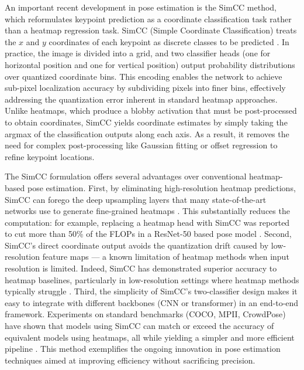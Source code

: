 An important recent development in pose estimation is the SimCC method, which reformulates keypoint prediction as a coordinate classification task rather than a heatmap regression task. SimCC (Simple Coordinate Classification) treats the $x$ and $y$ coordinates of each keypoint as discrete classes to be predicted \citep{Li2022SimCC}. In practice, the image is divided into a grid, and two classifier heads (one for horizontal position and one for vertical position) output probability distributions over quantized coordinate bins. This encoding enables the network to achieve sub-pixel localization accuracy by subdividing pixels into finer bins, effectively addressing the quantization error inherent in standard heatmap approaches. Unlike heatmaps, which produce a blobby activation that must be post-processed to obtain coordinates, SimCC yields coordinate estimates by simply taking the argmax of the classification outputs along each axis. As a result, it removes the need for complex post-processing like Gaussian fitting or offset regression to refine keypoint locations.

The SimCC formulation offers several advantages over conventional heatmap-based pose estimation. First, by eliminating high-resolution heatmap predictions, SimCC can forego the deep upsampling layers that many state-of-the-art networks use to generate fine-grained heatmaps \citep{Li2022SimCC}. This substantially reduces the computation: for example, replacing a heatmap head with SimCC was reported to cut more than 50\% of the FLOPs in a ResNet-50 based pose model \citep{Li2022SimCC}. Second, SimCC’s direct coordinate output avoids the quantization drift caused by low-resolution feature maps — a known limitation of heatmap methods when input resolution is limited. Indeed, SimCC has demonstrated superior accuracy to heatmap baselines, particularly in low-resolution settings where heatmap methods typically struggle \citep{Li2022SimCC}. Third, the simplicity of SimCC’s two-classifier design makes it easy to integrate with different backbones (CNN or transformer) in an end-to-end framework. Experiments on standard benchmarks (COCO, MPII, CrowdPose) have shown that models using SimCC can match or exceed the accuracy of equivalent models using heatmaps, all while yielding a simpler and more efficient pipeline \citep{Li2022SimCC}. This method exemplifies the ongoing innovation in pose estimation techniques aimed at improving efficiency without sacrificing precision.